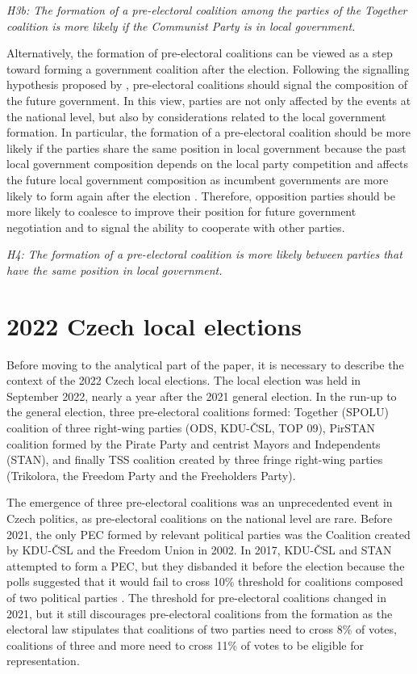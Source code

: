 \documentclass[]{interact}
\theoremstyle{plain}%
\theoremstyle{definition}
\theoremstyle{remark}
\begin{document}
\vspace{12pt}
\textit{H3b: The formation of a pre-electoral coalition among the parties of the Together coalition is more likely if the Communist Party is in local government.\label{hyp:3.2}}
\vspace{12pt}

Alternatively, the formation of pre-electoral coalitions can be viewed as a step toward forming a government coalition after the election. Following the signalling hypothesis proposed by \citet{golder2005}, pre-electoral coalitions should signal the composition of the future government. In this view, parties are not only affected by the events at the national level, but also by considerations related to the local government formation. 
In particular, the formation of a pre-electoral coalition should be more likely if the parties share the same position in local government because the past local government composition depends on the local party competition and affects the future local government composition as incumbent governments are more likely to form again after the election \citep{back2008}. Therefore, opposition parties should be more likely to coalesce to improve their position for future government negotiation and to signal the ability to cooperate with other parties. 

\textit{H4: The formation of a pre-electoral coalition is more likely between parties that have the same position in local government.\label{hyp:4}}

\section{2022 Czech local elections}

Before moving to the analytical part of the paper, it is necessary to describe the context of the 2022 Czech local elections. The local election was held in September 2022, nearly a year after the 2021 general election. 
In the run-up to the general election, three pre-electoral coalitions formed: Together (SPOLU) coalition of three right-wing parties (ODS, KDU-ČSL, TOP 09), PirSTAN coalition formed by the Pirate Party and centrist Mayors and Independents (STAN), and finally TSS coalition created by three fringe right-wing parties (Trikolora, the Freedom Party and the Freeholders Party). 

The emergence of three pre-electoral coalitions was an unprecedented event in Czech politics, as pre-electoral coalitions on the national level are rare. Before 2021, the only PEC formed by relevant political parties was the Coalition created by KDU-ČSL and the Freedom Union in 2002. In 2017, KDU-ČSL and STAN attempted to form a PEC, but they disbanded it before the election because the polls suggested that it would fail to cross 10\% threshold for coalitions composed of two political parties \citep{silar2019}. The threshold for pre-electoral coalitions changed in 2021, but it still discourages pre-electoral coalitions from the formation as the electoral law stipulates that coalitions of two parties need to cross 8\% of votes, coalitions of three and more need to cross 11\% of votes to be eligible for representation. 
\end{document}
